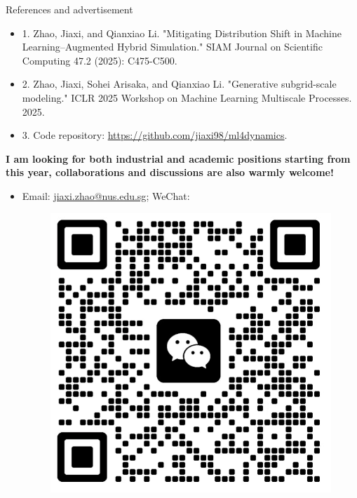 \documentclass[aspectratio=169]{beamer}
\begin{document}
\begin{frame}{References and advertisement}
	{\tiny
	\begin{itemize}
		\item 1. Zhao, Jiaxi, and Qianxiao Li. "Mitigating Distribution
		Shift in Machine Learning–Augmented Hybrid Simulation." SIAM Journal
		on Scientific Computing 47.2 (2025): C475-C500.
		\item 2. Zhao, Jiaxi, Sohei Arisaka, and Qianxiao Li. 
		"Generative subgrid-scale modeling." ICLR 2025 Workshop on Machine Learning Multiscale Processes. 2025.
		\item 3. Code repository: \url{https://github.com/jiaxi98/ml4dynamics}.
	\end{itemize}
	}

	\textbf{I am looking for both industrial and academic positions starting from this year, collaborations and
	discussions are also warmly welcome!}
	\begin{itemize}
		\item Email: \href{mailto:jiaxi.zhao@u.nus.edu}{jiaxi.zhao@nus.edu.sg}; 
		WeChat:
		\begin{figure}[ht] 
			\centering 
			\includegraphics[width=.3\textwidth]{fig/qrcode.jpg} 
		\end{figure}
	\end{itemize}
\end{frame}


 
 
\end{document}
